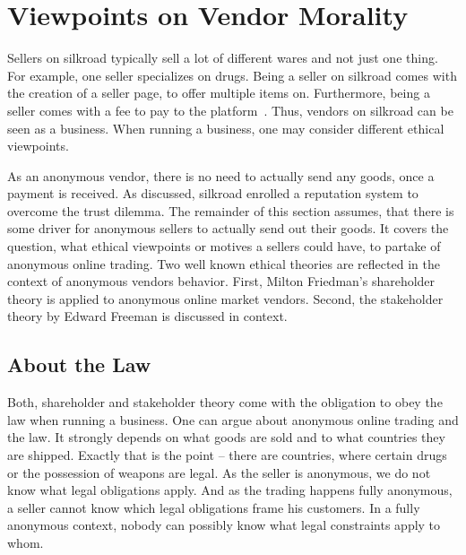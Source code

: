 \section{Viewpoints on Vendor Morality}
\label{vendors}

Sellers on silkroad typically sell a lot of different wares and not just one thing. For example, one seller specializes on drugs. Being a seller on silkroad comes with the creation of a seller page, to offer multiple items on. Furthermore, being a seller comes with a fee to pay to the platform~\cite{silkroad2013}. Thus, vendors on silkroad can be seen as a business. When running a business, one may consider different ethical viewpoints.

As an anonymous vendor, there is no need to actually send any goods, once a payment is received. As discussed, silkroad enrolled a reputation system to overcome the trust dilemma. The remainder of this section assumes, that there is some driver for anonymous sellers to actually send out their goods. It covers the question, what ethical viewpoints or motives a sellers could have, to partake of anonymous online trading. Two well known ethical theories are reflected in the context of anonymous vendors behavior. First, Milton Friedman's shareholder theory \cite{shareholder} is applied to anonymous online market vendors. Second, the stakeholder theory by Edward Freeman \cite{stakeholder} is discussed in context.


\subsection{About the Law}

Both, shareholder and stakeholder theory come with the obligation to obey the law when running a business\cite{shareholder, stakeholder}. One can argue about anonymous online trading and the law. It strongly depends on what goods are sold and to what countries they are shipped. Exactly that is the point -- there are countries, where certain drugs or the possession of weapons are legal. As the seller is anonymous, we do not know what legal obligations apply. And as the trading happens fully anonymous, a seller cannot know which legal obligations frame his customers. In a fully anonymous context, nobody can possibly know what legal constraints apply to whom.

